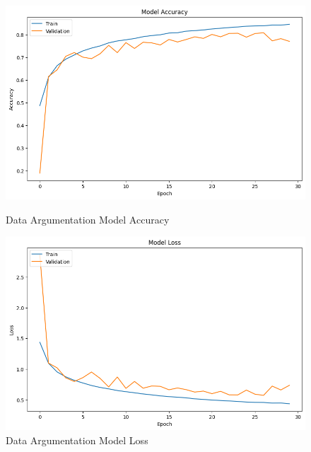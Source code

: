 \documentclass{article}
\begin{document}
\begin{enumerate}
    \begin{figure}[H]
        \centering
        \begin{minipage}{0.45\textwidth}
            \centering
            \includegraphics[width=\textwidth]{DataArgMA.png}
            \caption{Data Argumentation  Model Accuracy}
            \label{DAMA}
        \end{minipage}
        \hfill
        \begin{minipage}{0.45\textwidth}
            \centering
            \includegraphics[width=\textwidth]{DataArgML.png}
            \caption{Data Argumentation Model Loss}
            \label{DAML}
        \end{minipage}
    \end{figure}
    

\end{enumerate}
\end{document}
